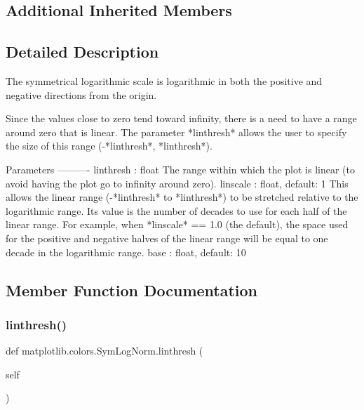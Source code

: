 \subsection*{Additional Inherited Members}


\subsection{Detailed Description}
\begin{DoxyVerb}The symmetrical logarithmic scale is logarithmic in both the
positive and negative directions from the origin.

Since the values close to zero tend toward infinity, there is a
need to have a range around zero that is linear.  The parameter
*linthresh* allows the user to specify the size of this range
(-*linthresh*, *linthresh*).

Parameters
----------
linthresh : float
    The range within which the plot is linear (to avoid having the plot
    go to infinity around zero).
linscale : float, default: 1
    This allows the linear range (-*linthresh* to *linthresh*) to be
    stretched relative to the logarithmic range. Its value is the
    number of decades to use for each half of the linear range. For
    example, when *linscale* == 1.0 (the default), the space used for
    the positive and negative halves of the linear range will be equal
    to one decade in the logarithmic range.
base : float, default: 10
\end{DoxyVerb}
 

\subsection{Member Function Documentation}
\mbox{\label{classmatplotlib_1_1colors_1_1SymLogNorm_a76533c742be26b29dd7c97ab0dba0c06}} 
\subsubsection{\texorpdfstring{linthresh()}{linthresh()}\hspace{0.1cm}{\footnotesize\ttfamily [1/2]}}
{\footnotesize\ttfamily def matplotlib.\+colors.\+Sym\+Log\+Norm.\+linthresh (\begin{DoxyParamCaption}\item[{}]{self }\end{DoxyParamCaption})}

